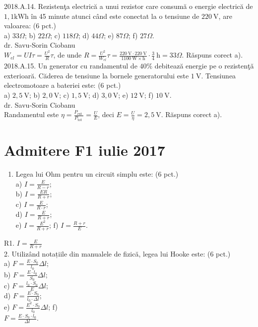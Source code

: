 2018.A.14. Rezistenţa electrică a unui rezistor care consumă o energie electrică de $1,1 \mathrm{kWh}$ în 45 minute atunci când este conectat la o tensiune de $220 \mathrm{~V}$, are valoarea: (6 pct.)\\ a) $33 \Omega$; b) $22 \Omega$; c) $118 \Omega$; d) $44 \Omega$; e) $87 \Omega$; f) $27 \Omega$.\\ dr. Savu-Sorin Ciobanu\\  $W_{e l}=U I \tau=\frac{U^{2}}{R} \tau$, de unde $R=\frac{U^{2}}{W_{e l}} \tau=\frac{220 \mathrm{~V} \cdot 220 \mathrm{~V}}{1100 \mathrm{~W} \times \mathrm{h}} \cdot \frac{3}{4} \mathrm{~h}=33 \Omega$. Răspuns corect a).\\

2018.A.15. Un generator cu randamentul de $40 \%$ debitează energie pe o rezistenţă exterioară. Căderea de tensiune la bornele generatorului este $1 \mathrm{~V}$. Tensiunea electromotoare a bateriei este: (6 pct.)\\ a) $2,5 \mathrm{~V}$; b) $2,0 \mathrm{~V}$; c) $1,5 \mathrm{~V}$; d) $3,0 \mathrm{~V}$; e) $12 \mathrm{~V}$; f) $10 \mathrm{~V}$.\\ dr. Savu-Sorin Ciobanu\\ Randamentul este $\eta=\frac{P_{\text {ext }}}{P_{\text {tot }}}=\frac{U}{E}$, deci $E=\frac{U}{\eta}=2,5 \mathrm{~V}$. Răspuns corect a).\\

\section{Admitere F1 iulie 2017}

\begin{enumerate}
  \item Legea lui Ohm pentru un circuit simplu este: (6 pct.)\\
a) $I=\frac{E}{R-r}$;\\
b) $I=\frac{E R}{R+r}$;\\
c) $I=\frac{E}{R \cdot r}$;\\
d) $I=\frac{E}{R+r}$;\\
e) $I=\frac{E^{2}}{R+r}$; f) $I=\frac{R+r}{E}$.
\end{enumerate}

R1. $I=\frac{E}{R+r}$\\
2. Utilizând notațiile din manualele de fizică, legea lui Hooke este: (6 pct.)\\
a) $F=\frac{E \cdot S_{0}}{l_{0}} \Delta l$;\\
b) $F=\frac{E \cdot l_{0}}{S_{0}} \Delta l$;\\
c) $F=\frac{l_{0} \cdot S_{0}}{E} \Delta l$;\\
d) $F=\frac{E \cdot S_{0}}{l_{0} \cdot \Delta l}$;\\
e) $F=\frac{E^{2} \cdot S_{0}}{l_{0}} \Delta l$; f)\\
$F=\frac{E \cdot S_{0} \cdot l_{0}}{\Delta l}$.

